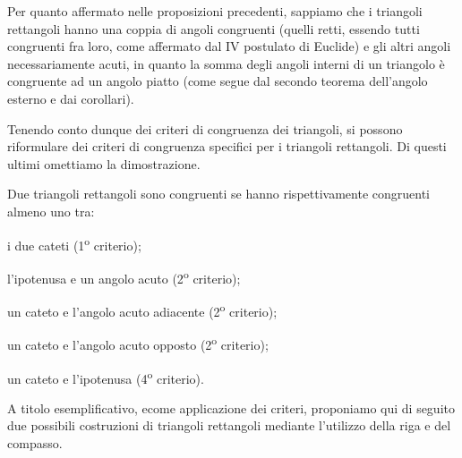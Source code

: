 Per quanto affermato nelle proposizioni precedenti, sappiamo che i 
triangoli rettangoli hanno una coppia di angoli congruenti (quelli 
retti, essendo tutti congruenti fra loro, come affermato dal IV 
postulato di Euclide) e gli altri angoli necessariamente acuti, in 
quanto la somma degli angoli interni di un triangolo è congruente ad 
un angolo piatto (come segue dal secondo teorema dell'angolo esterno 
e dai corollari).

Tenendo conto dunque dei criteri di congruenza dei triangoli, si 
possono riformulare dei criteri di congruenza specifici per i 
triangoli rettangoli. Di questi ultimi omettiamo la dimostrazione. 

\begin{teorema}
  Due triangoli rettangoli sono congruenti se hanno rispettivamente 
  congruenti almeno uno tra:
  \begin{itemize*}
    \item i due cateti (1\textsuperscript{o} criterio);
    \item l'ipotenusa e un angolo acuto (2\textsuperscript{o} criterio);
    \item un cateto e l'angolo acuto adiacente (2\textsuperscript{o} 
    criterio);
    \item un cateto e l'angolo acuto opposto (2\textsuperscript{o} 
    criterio);
    \item un cateto e l'ipotenusa (4\textsuperscript{o} criterio).
  \end{itemize*}
\end{teorema}

A titolo esemplificativo, ecome applicazione dei criteri, proponiamo qui di 
seguito  due possibili costruzioni di triangoli rettangoli mediante l'utilizzo 
della riga e del compasso.


